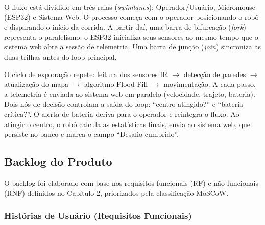 O fluxo está dividido em três raias (\textit{swimlanes}): Operador/Usuário, Micromouse (ESP32) e Sistema Web. O processo começa com o operador posicionando o robô e disparando o início da corrida. A partir daí, uma barra de bifurcação (\textit{fork}) representa o paralelismo: o ESP32 inicializa seus sensores ao mesmo tempo que o sistema web abre a sessão de telemetria. Uma barra de junção (\textit{join}) sincroniza as duas trilhas antes do loop principal.

O ciclo de exploração repete: leitura dos sensores IR $\rightarrow$ detecção de paredes $\rightarrow$ atualização do mapa $\rightarrow$ algoritmo Flood Fill $\rightarrow$ movimentação. A cada passo, a telemetria é enviada ao sistema web em paralelo (velocidade, trajeto, bateria). Dois nós de decisão controlam a saída do loop: ``centro atingido?'' e ``bateria crítica?''. O alerta de bateria deriva para o operador e reintegra o fluxo. Ao atingir o centro, o robô calcula as estatísticas finais, envia ao sistema web, que persiste no banco e marca o campo ``Desafio cumprido''.

\subsection{Backlog do Produto}
 
O backlog foi elaborado com base nos requisitos funcionais (RF) e não funcionais (RNF) definidos no Capítulo 2, priorizados pela classificação MoSCoW.

\subsubsection{Histórias de Usuário (Requisitos Funcionais)}
 
